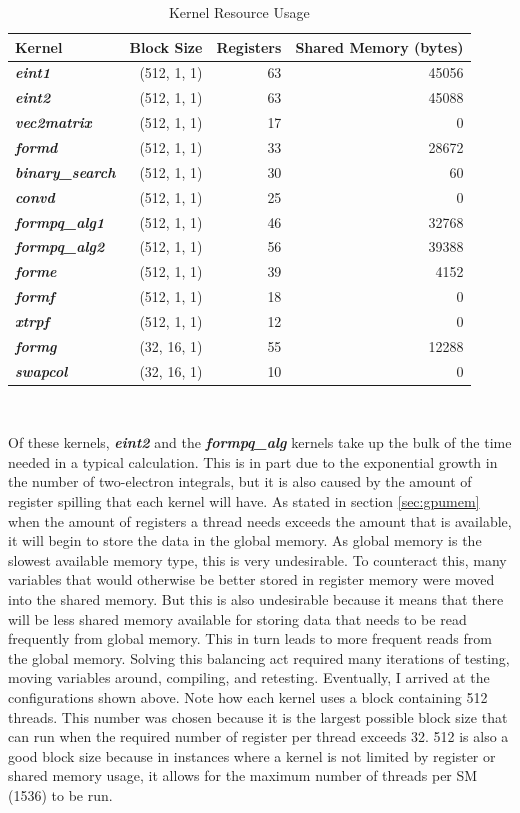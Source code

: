 \documentclass[12pt]{report}
\newcommand{\kernel}[1]{\textit{\textbf{#1}}}
\begin{document}
\begin{table}[h]
\centering
\caption{Kernel Resource Usage}
\label{tab:resources}
\begin{tabular}{lrrr}
\toprule
	Kernel				&	Block Size		&	Registers	&	Shared Memory (bytes)	\\
\midrule
	\kernel{eint1}			&	(512, 1, 1)		&	63		&	45056				\\
	\kernel{eint2}			&	(512, 1, 1)		&	63		&	45088				\\
	\kernel{vec2matrix}		&	(512, 1, 1)		&	17		&	0					\\
	\kernel{formd}			&	(512, 1, 1)		&	33		&	28672				\\
	\kernel{binary\_search}	&	(512, 1, 1)		&	30		&	60					\\
	\kernel{convd}			&	(512, 1, 1)		&	25		&	0					\\
	\kernel{formpq\_alg1}	&	(512, 1, 1)		&	46		&	32768				\\
	\kernel{formpq\_alg2}	&	(512, 1, 1)		&	56		&	39388				\\
	\kernel{forme}			&	(512, 1, 1)		&	39		&	4152					\\
	\kernel{formf}			&	(512, 1, 1)		&	18		&	0					\\
	\kernel{xtrpf}			&	(512, 1, 1)		&	12		&	0					\\
	\kernel{formg}			&	(32, 16, 1)		&	55		&	12288				\\
	\kernel{swapcol}		&	(32, 16, 1)		&	10		&	0					\\
\bottomrule
\end{tabular}\\
\end{table}

Of these kernels, \kernel{eint2} and the \kernel{formpq\_alg} kernels take up the bulk of the time needed in a typical calculation. This is in part due to the exponential growth in the number of two-electron integrals, but it is also caused by the amount of register spilling that each kernel will have. As stated in section \ref{sec:gpumem} when the amount of registers a thread needs exceeds the amount that is available, it will begin to store the data in the global memory. As global memory is the slowest available memory type, this is very undesirable. To counteract this, many variables that would otherwise be better stored in register memory were moved into the shared memory. But this is also undesirable because it means that there will be less shared memory available for storing data that needs to be read frequently from global memory. This in turn leads to more frequent reads from the global memory. Solving this balancing act required many iterations of testing, moving variables around, compiling, and retesting. Eventually, I arrived at the configurations shown above. Note how each kernel uses a block containing 512 threads. This number was chosen because it is the largest possible block size that can run when the required number of register per thread exceeds 32. 512 is also a good block size because in instances where a kernel is not limited by register or shared memory usage, it allows for the maximum number of threads per SM (1536) to be run.
\end{document}
